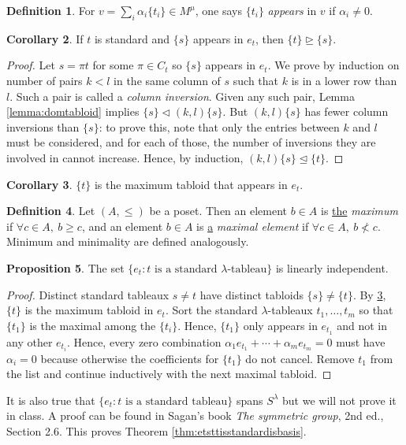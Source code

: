 \documentclass[a4paper]{article}
\theoremstyle{definition}
\newtheorem{defn}{Definition}[subsection]
\newtheorem{prop}[defn]{Proposition}
\newtheorem{coro}[defn]{Corollary}
\begin{document}
\begin{defn}
For $v=\sum_i \alpha_i\{t_i\}\in M^\mu$, one says $\{t_i\}$ \textit{appears} in $v$ if $\alpha_i\neq 0$.
\end{defn}

\begin{coro}
If $t$ is standard and $\{s\}$ appears in $e_t$, then $\{t\}\unrhd\{s\}$.
\end{coro}
\begin{proof}
Let $s=\pi t$ for some $\pi\in C_t$ so $\{s\}$ appears in $e_t$. We prove by induction on number of pairs $k<l$ in the same column of $s$ such that $k$ is in a lower row than $l$. Such a pair is called a \textit{column inversion}. Given any such pair, Lemma \ref{lemma:domtabloid} implies $\{s\}\lhd (k,l)\{s\}$. But $(k,l)\{s\}$ has fewer column inversions than $\{s\}$: to prove this, note that only the entries between $k$ and $l$ must be considered, and for each of those, the number of inversions they are involved in cannot increase. Hence, by induction, $(k,l)\{s\}\unlhd\{t\}$.
\end{proof}

\begin{coro}
\label{coro:tismaxofet}
$\{t\}$ is the maximum tabloid that appears in $e_t$.
\end{coro}
\begin{defn}
Let $(A,\leq)$ be a poset. Then an element $b\in A$ is \underline{the} \textit{maximum} if $\forall c\in A,\ b\geq c$, and an element $b\in A$ is \underline{a} \textit{maximal element} if $\forall c\in A,\ b\not<c$. Minimum and minimality are defined analogously.
\end{defn}

\begin{prop}
The set $\{e_t:t\text{ is a standard }\lambda\text{-tableau}\}$ is linearly independent.
\end{prop}
\begin{proof}
Distinct standard tableaux $s\neq t$ have distinct tabloids $\{s\}\neq \{t\}$. By \ref{coro:tismaxofet}, $\{t\}$ is the maximum tabloid in $e_t$. Sort the standard $\lambda$-tableaux $t_1,\ldots,t_m$ so that $\{t_1\}$ is the maximal among the $\{t_i\}$. Hence, $\{t_1\}$ only appears in $e_{t_1}$ and not in any other $e_{t_i}$. Hence, every zero combination $\alpha_1e_{t_1}+\cdots+\alpha_me_{t_m}=0$ must have $\alpha_i=0$ because otherwise the coefficients for $\{t_1\}$ do not cancel. Remove $t_1$ from the list and continue inductively with the next maximal tabloid.
\end{proof}
It is also true that $\{e_t:t\text{ is a standard tableau}\}$ spans $S^\lambda$ but we will not prove it in class. A proof can be found in Sagan's book \textit{The symmetric group}, 2nd ed., Section 2.6. This proves Theorem \ref{thm:etsttisstandardisbasis}.
\end{document}
